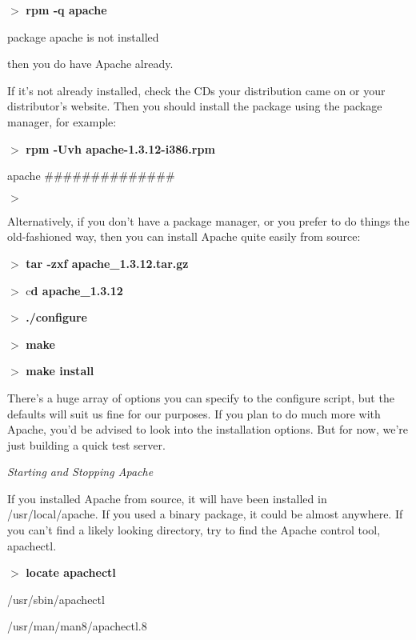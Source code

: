 \documentclass[a4paper,11pt]{book}
\begin{document}
\noindent $>$ \textbf{rpm -q apache}

\noindent package apache is not installed

\noindent 

\noindent then you do have Apache already.

\noindent 

\noindent If it's not already installed, check the CDs your distribution came on or your distributor's website. Then you should install the package using the package manager, for example:

\noindent 

\noindent $>$ \textbf{rpm -Uvh apache-1.3.12-i386.rpm}

\noindent apache \#\#\#\#\#\#\#\#\#\#\#\#\#\#

\noindent $>$

\noindent 

\noindent Alternatively, if you don't have a package manager, or you prefer to do things the old-fashioned way, then you can install Apache quite easily from source:

\noindent 

\noindent $>$ \textbf{tar -zxf apache\_1.3.12.tar.gz}

\noindent $>$ c\textbf{d apache\_1.3.12}

\noindent $>$ \textbf{./configure}

\noindent $>$ \textbf{make}

\noindent $>$ \textbf{make install}

\noindent 

\noindent There's a huge array of options you can specify to the configure script, but the defaults will suit us fine for our purposes. If you plan to do much more with Apache, you'd be advised to look into the installation options. But for now, we're just building a quick test server.

\noindent 

\noindent \textit{Starting and Stopping Apache}

\noindent If you installed Apache from source, it will have been installed in /usr/local/apache. If you used a binary package, it could be almost anywhere. If you can't find a likely looking directory, try to find the Apache control tool, apachectl.

\noindent 

\noindent $>$ \textbf{locate apachectl}

\noindent /usr/sbin/apachectl

\noindent /usr/man/man8/apachectl.8
\end{document}
